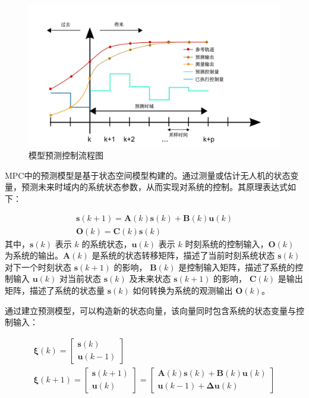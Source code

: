 \documentclass[lang=chs, degree=master, blindreview=false, winfonts=true]{yanputhesis}
\begin{document}
\begin{figure}[hbt!]
	\centering
	\includegraphics[width=40pc]{picture/mpc.jpg} 
	\caption{模型预测控制流程图} \label{mpc}
\end{figure}
MPC中的预测模型是基于状态空间模型构建的。通过测量或估计无人机的状态变量，预测未来时域内的系统状态参数，从而实现对系统的控制。其原理表达式如下：

\begin{equation}
	\begin{gathered}
\bm s(k+1) = \bm A(k)\bm s(k) + \bm B(k) \bm u(k)\\\bm O(k) = \bm C(k) \bm s(k)
\end{gathered}
\end{equation}
其中，$\bm s(k)$ 表示 $k$ 的系统状态，$\bm u(k)$ 表示 $k$ 时刻系统的控制输入，$\bm O(k)$ 为系统的输出。$\bm A(k)$ 是系统的状态转移矩阵，描述了当前时刻系统状态 $\bm s(k)  $对下一个时刻状态 $ \bm s(k+1)$ 的影响，
$\bm B(k)$  是控制输入矩阵，描述了系统的控制输入 $ \bm u(k)$ 对当前状态  $\bm s(k)$  及未来状态  $\bm s(k+1)$ 的影响，
$\bm C(k)$ 是输出矩阵，描述了系统的状态量 $\bm s(k)$ 如何转换为系统的观测输出 $\bm O(k)$。

通过建立预测模型，可以构造新的状态向量，该向量同时包含系统的状态变量与控制输入：

\begin{equation}
	\begin{gathered}\bm \xi(k)=\begin{bmatrix}\bm s(k)\\\bm u(k-1)\end{bmatrix}\\\bm \xi(k+1)=\begin{bmatrix}\bm s(k+1)\\\bm u(k)\end{bmatrix}=\begin{bmatrix}\bm A(k)\bm s(k)+\bm B(k)\bm u(k)\\\bm u(k-1)+\bm \Delta \bm u(k)\end{bmatrix}\end{gathered}
\end{equation}
\end{document}
